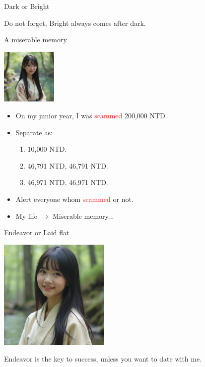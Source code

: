 \documentclass{beamer}
\begin{document}
\begin{frame}{Dark or Bright}
\begin{minipage}{0.4\textwidth}
\begin{center}
\end{center}
\begin{center}
Do not forget, Bright always comes after dark.
\end{center}
\end{minipage}
\end{frame}
\begin{frame}{A miserable memory}
\begin{center}
\includegraphics[width=0.2\textwidth]{scam_mem.png}
\end{center}
\begin{itemize}
\item On my junior year, I was \textcolor{red}{scammed} 200,000 NTD.
\item Separate as:
\begin{enumerate}
\item 10,000 NTD.
\item 46,791 NTD, 46,791 NTD.
\item 46,971 NTD, 46,971 NTD.
\end{enumerate}
\item Alert everyone whom \textcolor{red}{scammed} or not.
\item My life $\rightarrow$ Miserable memory...
\end{itemize}
\end{frame}
\begin{frame}{Endeavor or Laid flat}
\begin{center}
\includegraphics[width=0.4\textwidth]{fail.png}
\end{center}
\begin{center}
Endeavor is the key to success, unless you want to date with me.
\end{center}
\end{frame}
\end{document}
